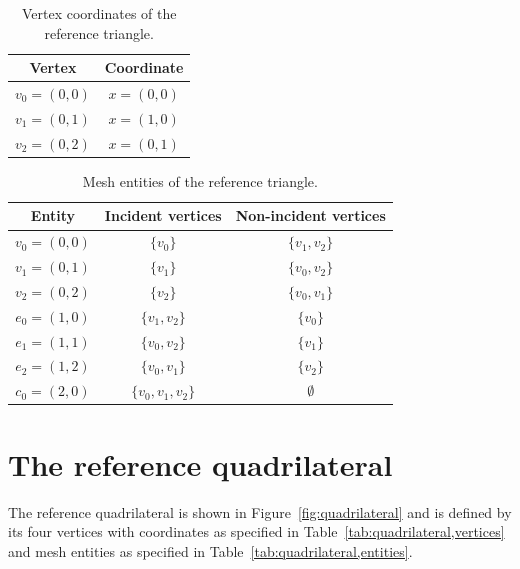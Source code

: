 \begin{table}[H]
\linespread{1.2}\selectfont
  \begin{center}
    \begin{tabular}{|c|c|}
      \hline
      Vertex & Coordinate \\
      \hline
      \hline
      $v_0 = (0, 0)$ & $x = (0, 0)$ \\
      \hline
      $v_1 = (0, 1)$ & $x = (1, 0)$ \\
      \hline
      $v_2 = (0, 2)$ & $x = (0, 1)$ \\
      \hline
    \end{tabular}
    \caption{Vertex coordinates of the reference triangle.}
    \label{tab:triangle,vertices}
  \end{center}
\end{table}

\begin{table}[H]
\linespread{1.2}\selectfont
  \begin{center}
    \begin{tabular}{|c|c|c|}
      \hline
      Entity & Incident vertices & Non-incident vertices \\
      \hline
      \hline
      $v_0 = (0, 0)$ & $\{v_0\}$ & $\{v_1, v_2\}$ \\
      \hline
      $v_1 = (0, 1)$ & $\{v_1\}$ & $\{v_0, v_2\}$ \\
      \hline
      $v_2 = (0, 2)$ & $\{v_2\}$ & $\{v_0, v_1\}$ \\
      \hline
      $e_0 = (1, 0)$ & $\{v_1, v_2\}$ & $\{v_0\}$ \\
      \hline
      $e_1 = (1, 1)$ & $\{v_0, v_2\}$ & $\{v_1\}$ \\
      \hline
      $e_2 = (1, 2)$ & $\{v_0, v_1\}$ & $\{v_2\}$ \\
      \hline
      $c_0 = (2, 0)$ & $\{v_0, v_1, v_2\}$ & $\emptyset$ \\
      \hline
    \end{tabular}
    \caption{Mesh entities of the reference triangle.}
    \label{tab:triangle,entities}
  \end{center}
\end{table}

\newpage
\section{The reference quadrilateral}

The reference quadrilateral is shown in Figure~\ref{fig:quadrilateral}
and is defined by its four vertices with coordinates as specified in
Table~\ref{tab:quadrilateral,vertices} and mesh entities as specified
in Table~\ref{tab:quadrilateral,entities}.

